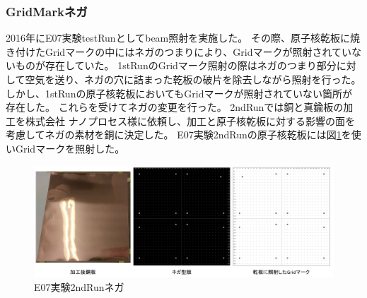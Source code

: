 \documentclass[12pt,a4paper]{jarticle}
\begin{document}
\subsubsection{GridMarkネガ}
2016年にE07実験testRunとしてbeam照射を実施した。
その際、原子核乾板に焼き付けたGridマークの中にはネガのつまりにより、Gridマークが照射されていないものが存在していた。
1stRunのGridマーク照射の際はネガのつまり部分に対して空気を送り、ネガの穴に詰まった乾板の破片を除去しながら照射を行った。
しかし、1stRunの原子核乾板においてもGridマークが照射されていない箇所が存在した。
これらを受けてネガの変更を行った。
2ndRunでは銅と真鍮板の加工を株式会社 ナノプロセス様に依頼し、加工と原子核乾板に対する影響の面を考慮してネガの素材を銅に決定した。
E07実験2ndRunの原子核乾板には図\ref{fig:nega_2ndRun}を使いGridマークを照射した。
\begin{figure}[htbp]
  \centering
    \includegraphics[width=140mm]{grid_nega.png}
  \caption{E07実験2ndRunネガ\label{fig:nega_2ndRun}}
\end{figure}
\end{document}
